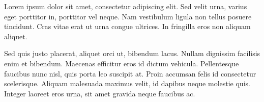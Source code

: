 Lorem ipsum dolor sit amet, consectetur adipiscing elit. Sed velit urna, varius eget porttitor in, porttitor vel neque. Nam vestibulum ligula non tellus posuere tincidunt. Cras vitae erat ut urna congue ultrices. In fringilla eros non aliquam aliquet.

Sed quis justo placerat, aliquet orci ut, bibendum lacus. Nullam dignissim facilisis enim et bibendum. Maecenas efficitur eros id dictum vehicula. Pellentesque faucibus nunc nisl, quis porta leo suscipit at. Proin accumsan felis id consectetur scelerisque. Aliquam malesuada maximus velit, id dapibus neque molestie quis. Integer laoreet eros urna, sit amet gravida neque faucibus ac.